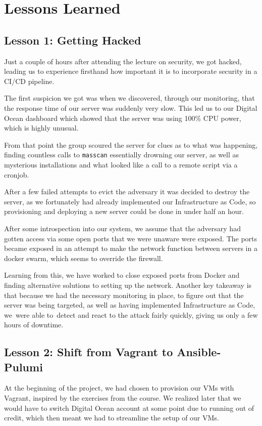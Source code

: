 \section{Lessons Learned}

\subsection{Lesson 1: Getting Hacked}
\label{section_hacked}
Just a couple of hours after attending the lecture on security, we got hacked, leading us to experience firsthand how important it is to incorporate security in a CI/CD pipeline.

The first suspicion we got was when we discovered, through our monitoring, that the response time of our server was suddenly very slow. This led us to our Digital Ocean dashboard which showed that the server was using 100\% CPU power, which is highly unusual.

From that point the group scoured the server for clues as to what was happening, finding countless calls to \texttt{masscan} essentially drowning our server, as well as mysterious installations and what looked like a call to a remote script via a cronjob.

After a few failed attempts to evict the adversary it was decided to destroy the server, as we fortunately had already implemented our Infrastructure as Code, so provisioning and deploying a new server could be done in under half an hour.

After some introspection into our system, we assume that the adversary had gotten access via some open ports that we were unaware were exposed. The ports became exposed in an attempt to make the network function between servers in a docker swarm, which seems to override the firewall.

Learning from this, we have worked to close exposed ports from Docker and finding alternative solutions to setting up the network. Another key takeaway is that because we had the necessary monitoring in place, to figure out that the server was being targeted, as well as having implemented Infrastructure as Code, we were able to detect and react to the attack fairly quickly, giving us only a few hours of downtime.

\subsection{Lesson 2: Shift from Vagrant to Ansible-Pulumi}
At the beginning of the project, we had chosen to provision our VMs with Vagrant, inspired by the exercises from the course.
We realized later that we would have to switch Digital Ocean account at some point due to running out of credit, which then meant we had to streamline the setup of our VMs.

